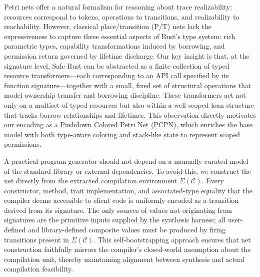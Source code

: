 \documentclass[runningheads]{llncs}
\begin{document}
Petri nets offer a natural formalism for reasoning about trace realizability: resources correspond to tokens, operations to transitions, and realizability to reachability. However, classical place/transition (P/T) nets lack the expressiveness to capture three essential aspects of Rust's type system: rich parametric types, capability transformations induced by borrowing, and permission return governed by lifetime discharge. Our key insight is that, at the signature level, Safe Rust can be abstracted as a finite collection of typed resource transformers—each corresponding to an API call specified by its function signature—together with a small, fixed set of structural operations that model ownership transfer and borrowing discipline. These transformers act not only on a multiset of typed resources but also within a well-scoped loan structure that tracks borrow relationships and lifetimes. This observation directly motivates our encoding as a Pushdown Colored Petri Net (PCPN), which enriches the base model with both type-aware coloring and stack-like state to represent scoped permissions.

A practical program generator should not depend on a manually curated model of the standard library or external dependencies. To avoid this, we construct the net directly from the extracted compilation environment $\Sigma(\mathcal{C})$. Every constructor, method, trait implementation, and associated-type equality that the compiler deems accessible to client code is uniformly encoded as a transition derived from its signature. The only sources of values not originating from signatures are the primitive inputs supplied by the synthesis harness; all user-defined and library-defined composite values must be produced by firing transitions present in $\Sigma(\mathcal{C})$. This self-bootstrapping approach ensures that net construction faithfully mirrors the compiler’s closed-world assumption about the compilation unit, thereby maintaining alignment between synthesis and actual compilation feasibility.
\end{document}
